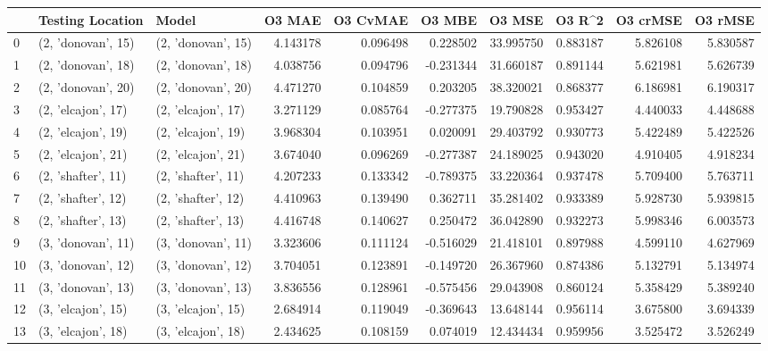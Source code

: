 \begin{tabular}{lllrrrrrrr}
\toprule
{} &    Testing Location &               Model &    O3 MAE &  O3 CvMAE &    O3 MBE &     O3 MSE &    O3 R\textasciicircum2 &  O3 crMSE &   O3 rMSE \\
\midrule
0  &  (2, 'donovan', 15) &  (2, 'donovan', 15) &  4.143178 &  0.096498 &  0.228502 &  33.995750 &  0.883187 &  5.826108 &  5.830587 \\
1  &  (2, 'donovan', 18) &  (2, 'donovan', 18) &  4.038756 &  0.094796 & -0.231344 &  31.660187 &  0.891144 &  5.621981 &  5.626739 \\
2  &  (2, 'donovan', 20) &  (2, 'donovan', 20) &  4.471270 &  0.104859 &  0.203205 &  38.320021 &  0.868377 &  6.186981 &  6.190317 \\
3  &  (2, 'elcajon', 17) &  (2, 'elcajon', 17) &  3.271129 &  0.085764 & -0.277375 &  19.790828 &  0.953427 &  4.440033 &  4.448688 \\
4  &  (2, 'elcajon', 19) &  (2, 'elcajon', 19) &  3.968304 &  0.103951 &  0.020091 &  29.403792 &  0.930773 &  5.422489 &  5.422526 \\
5  &  (2, 'elcajon', 21) &  (2, 'elcajon', 21) &  3.674040 &  0.096269 & -0.277387 &  24.189025 &  0.943020 &  4.910405 &  4.918234 \\
6  &  (2, 'shafter', 11) &  (2, 'shafter', 11) &  4.207233 &  0.133342 & -0.789375 &  33.220364 &  0.937478 &  5.709400 &  5.763711 \\
7  &  (2, 'shafter', 12) &  (2, 'shafter', 12) &  4.410963 &  0.139490 &  0.362711 &  35.281402 &  0.933389 &  5.928730 &  5.939815 \\
8  &  (2, 'shafter', 13) &  (2, 'shafter', 13) &  4.416748 &  0.140627 &  0.250472 &  36.042890 &  0.932273 &  5.998346 &  6.003573 \\
9  &  (3, 'donovan', 11) &  (3, 'donovan', 11) &  3.323606 &  0.111124 & -0.516029 &  21.418101 &  0.897988 &  4.599110 &  4.627969 \\
10 &  (3, 'donovan', 12) &  (3, 'donovan', 12) &  3.704051 &  0.123891 & -0.149720 &  26.367960 &  0.874386 &  5.132791 &  5.134974 \\
11 &  (3, 'donovan', 13) &  (3, 'donovan', 13) &  3.836556 &  0.128961 & -0.575456 &  29.043908 &  0.860124 &  5.358429 &  5.389240 \\
12 &  (3, 'elcajon', 15) &  (3, 'elcajon', 15) &  2.684914 &  0.119049 & -0.369643 &  13.648144 &  0.956114 &  3.675800 &  3.694339 \\
13 &  (3, 'elcajon', 18) &  (3, 'elcajon', 18) &  2.434625 &  0.108159 &  0.074019 &  12.434434 &  0.959956 &  3.525472 &  3.526249 \\

\end{tabular}
